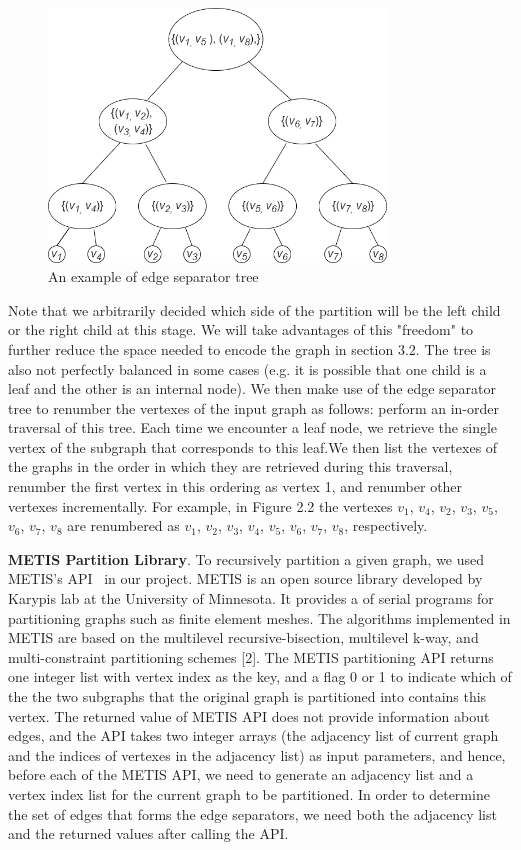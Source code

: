 \documentclass[12pt,glossary]{dalthesis}
\begin{document}
\begin{figure}[ht]
\centering
\includegraphics[width=0.8\textwidth]{separatorTree}
\caption{An example of edge separator tree}
\end{figure}

\bigskip
\bigskip
Note that we arbitrarily decided which side of the partition will be the left child or the right child at this stage. We will take advantages of this "freedom" to further reduce the space needed to encode the graph in section 3.2. The tree is also not perfectly balanced in some cases (e.g. it is possible that one child is a leaf and the other is an internal node). We then make use of the edge separator tree to renumber the vertexes of the input graph as follows: perform an in-order traversal of this tree. Each time we encounter a leaf node, we retrieve the single vertex of the subgraph that corresponds to this leaf.We then list the vertexes of the graphs in the order in which they are retrieved during this traversal, renumber the first vertex in this ordering as vertex 1, and renumber other vertexes incrementally. For example, in Figure 2.2 the vertexes $v_{1}$, $v_{4}$, $v_{2}$, $v_{3}$, $v_{5}$, $v_{6}$, $v_{7}$, $v_{8}$ are renumbered as $v_{1}$, $v_{2}$, $v_{3}$, $v_{4}$, $v_{5}$, $v_{6}$, $v_{7}$, $v_{8}$, respectively.

\bigskip
\bigskip

\textbf{METIS Partition Library}. To recursively partition a given graph, we used METIS's API~\cite{metis-lib} in our project. METIS is an open source library developed by Karypis lab at the University of Minnesota. It provides a of serial programs for partitioning graphs such as finite element meshes. The algorithms implemented in METIS are based on the multilevel recursive-bisection, multilevel k-way, and multi-constraint partitioning schemes [2]. The METIS partitioning API returns one integer list with vertex index as the key, and a flag 0 or 1 to indicate which of the the two subgraphs that the original graph is partitioned into contains this vertex. The returned value of METIS API does not provide information about edges, and the API takes two integer arrays (the adjacency list of current graph and the indices of vertexes in the adjacency list) as input parameters, and hence, before each of the METIS API, we need to generate an adjacency list and a vertex index list for the current graph to be partitioned. In order to determine the set of edges that forms the edge separators, we need both the adjacency list and the returned values after calling the API.
\end{document}

